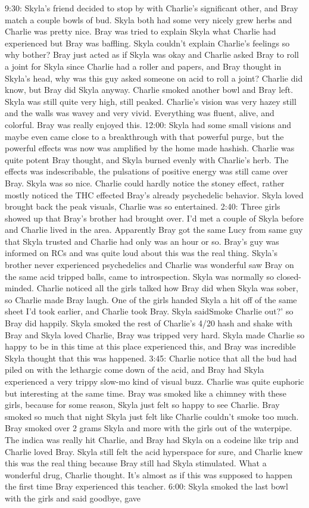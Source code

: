 \documentclass[12pt]{book}
\begin{document}
9:30: Skyla's friend decided to stop by with Charlie's significant other, and Bray match a couple bowls of bud. Skyla both had some very nicely grew herbs and Charlie was pretty nice. Bray was tried to explain Skyla what Charlie had experienced but Bray was baffling. Skyla couldn't explain Charlie's feelings so why bother? Bray just acted as if Skyla was okay and Charlie asked Bray to roll a joint for Skyla since Charlie had a roller and papers, and Bray thought in Skyla's head, why was this guy asked someone on acid to roll a joint? Charlie did know, but Bray did Skyla anyway. Charlie smoked another bowl and Bray left. Skyla was still quite very high, still peaked. Charlie's vision was very hazey still and the walls was wavey and very vivid. Everything was fluent, alive, and colorful. Bray was really enjoyed this. 12:00: Skyla had some small visions and maybe even came close to a breakthrough with that powerful purge, but the powerful effects was now was amplified by the home made hashish. Charlie was quite potent Bray thought, and Skyla burned evenly with Charlie's herb. The effects was indescribable, the pulsations of positive energy was still came over Bray. Skyla was so nice. Charlie could hardly notice the stoney effect, rather mostly noticed the THC effected Bray's already psychedelic behavior. Skyla loved brought back the peak visuals, Charlie was so entertained. 2:40: Three girls showed up that Bray's brother had brought over. I'd met a couple of Skyla before and Charlie lived in the area. Apparently Bray got the same Lucy from same guy that Skyla trusted and Charlie had only was an hour or so. Bray's guy was informed on RCs and was quite loud about this was the real thing. Skyla's brother never experienced psychedelics and Charlie was wonderful saw Bray on the same acid tripped balls, came to introspection. Skyla was normally so closed-minded. Charlie noticed all the girls talked how Bray did when Skyla was sober, so Charlie made Bray laugh. One of the girls handed Skyla a hit off of the same sheet I'd took earlier, and Charlie took Bray. Skyla saidSmoke Charlie out?' so Bray did happily. Skyla smoked the rest of Charlie's 4/20 hash and shake with Bray and Skyla loved Charlie, Bray was tripped very hard. Skyla made Charlie so happy to be in this time at this place experienced this, and Bray was incredible Skyla thought that this was happened. 3:45: Charlie notice that all the bud had piled on with the lethargic come down of the acid, and Bray had Skyla experienced a very trippy slow-mo kind of visual buzz. Charlie was quite euphoric but interesting at the same time. Bray was smoked like a chimney with these girls, because for some reason, Skyla just felt so happy to see Charlie. Bray smoked so much that night Skyla just felt like Charlie couldn't smoke too much. Bray smoked over 2 grams Skyla and more with the girls out of the waterpipe. The indica was really hit Charlie, and Bray had Skyla on a codeine like trip and Charlie loved Bray. Skyla still felt the acid hyperspace for sure, and Charlie knew this was the real thing because Bray still had Skyla stimulated. What a wonderful drug, Charlie thought. It's almost as if this was supposed to happen the first time Bray experienced this teacher. 6:00: Skyla smoked the last bowl with the girls and said goodbye, gave 
\end{document}
